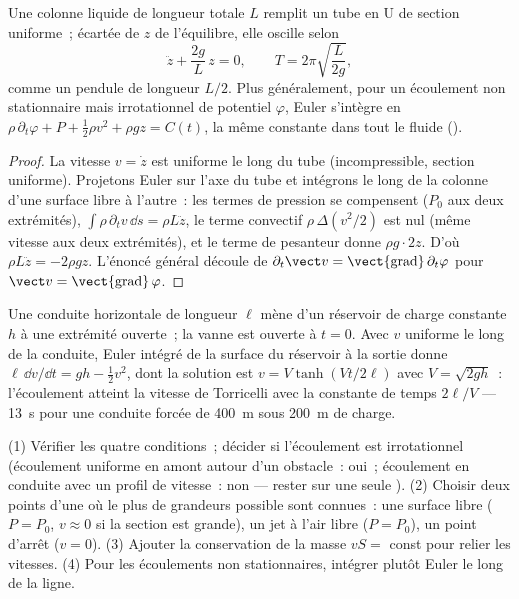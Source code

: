 \begin{proposition}\label{prop:b2:euler-bernoulli:utube}
Une colonne liquide de longueur totale $L$ remplit un tube en U de section uniforme~;
écartée de $z$ de l'équilibre, elle oscille selon
\[
\ddot z + \frac{2g}{L}\,z = 0 , \qquad T = 2\pi\sqrt{\frac{L}{2g}} ,
\]
comme un pendule de longueur $L/2$. Plus généralement, pour un écoulement non stationnaire mais
irrotationnel de potentiel $\varphi$, Euler s'intègre en
$\rho\,\partial_t\varphi + P + \tfrac12\rho v^2 + \rho gz = C(t)$, la même
constante dans tout le fluide ().
\end{proposition}

\begin{proof}
La vitesse $v = \dot z$ est uniforme le long du tube (incompressible,
section uniforme). Projetons Euler sur l'axe du tube et intégrons le long
de la colonne d'une surface libre à l'autre~: les termes de pression se
compensent ($P_0$ aux deux extrémités), $\int\rho\,\partial_tv\,\dd s = \rho L\ddot z$, le
terme convectif $\rho\,\Delta(v^2/2)$ est nul (même vitesse aux deux extrémités),
et le terme de pesanteur donne $\rho g\cdot2z$. D'où $\rho L\ddot z = -2\rho gz$.
L'énoncé général découle de $\partial_t\vect v = \operatorname{\vect{grad}}
\partial_t\varphi$ pour $\vect v = \operatorname{\vect{grad}}\varphi$.
\end{proof}

\begin{example}\label{ex:b2:euler-bernoulli:start}
Une conduite horizontale de longueur $\ell$ mène d'un réservoir de charge
constante $h$ à une extrémité ouverte~; la vanne est ouverte à $t = 0$. Avec $v$ uniforme
le long de la conduite, Euler intégré de la surface du réservoir à la
sortie donne $\ell\,\dd v/\dd t = gh - \tfrac12v^2$, dont la solution est
$v = V\tanh(Vt/2\ell)$ avec $V = \sqrt{2gh}$~: l'écoulement atteint la vitesse de
Torricelli avec la constante de temps $2\ell/V$ --- \qty{13}{s} pour une conduite forcée de
\qty{400}{m} sous \qty{200}{m} de charge.
\end{example}

\begin{method}\label{met:b2:euler-bernoulli:method}
(1) Vérifier les quatre conditions~; décider si l'écoulement est irrotationnel
(écoulement uniforme en amont autour d'un obstacle~: oui~; écoulement en conduite avec un
profil de vitesse~: non --- rester sur une seule ). (2) Choisir deux points
d'une  où le plus de grandeurs possible sont connues~: une surface
libre ($P = P_0$, $v \approx 0$ si la section est grande), un jet à
l'air libre ($P = P_0$), un point d'arrêt ($v = 0$). (3) Ajouter la conservation
de la masse $vS = $ const pour relier les vitesses. (4) Pour les écoulements non
stationnaires, intégrer plutôt Euler le long de la ligne.
\end{method}

